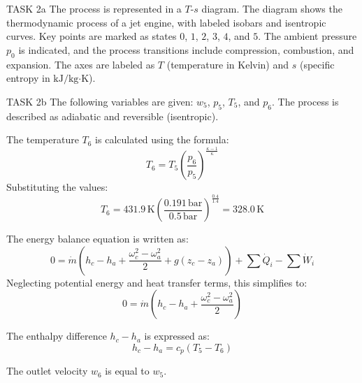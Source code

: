 TASK 2a  
The process is represented in a \( T \)-\( s \) diagram. The diagram shows the thermodynamic process of a jet engine, with labeled isobars and isentropic curves. Key points are marked as states \( 0 \), \( 1 \), \( 2 \), \( 3 \), \( 4 \), and \( 5 \). The ambient pressure \( p_0 \) is indicated, and the process transitions include compression, combustion, and expansion. The axes are labeled as \( T \) (temperature in Kelvin) and \( s \) (specific entropy in \( \text{kJ}/\text{kg·K} \)).  

TASK 2b  
The following variables are given: \( w_5 \), \( p_5 \), \( T_5 \), and \( p_6 \). The process is described as adiabatic and reversible (isentropic).  

The temperature \( T_6 \) is calculated using the formula:  
\[
T_6 = T_5 \left( \frac{p_6}{p_5} \right)^{\frac{\kappa - 1}{\kappa}}
\]  
Substituting the values:  
\[
T_6 = 431.9 \, \text{K} \left( \frac{0.191 \, \text{bar}}{0.5 \, \text{bar}} \right)^{\frac{0.4}{1.4}} = 328.0 \, \text{K}
\]  

The energy balance equation is written as:  
\[
0 = \dot{m} \left( h_c - h_a + \frac{\omega_c^2 - \omega_a^2}{2} + g(z_c - z_a) \right) + \sum \dot{Q}_i - \sum \dot{W}_i
\]  
Neglecting potential energy and heat transfer terms, this simplifies to:  
\[
0 = \dot{m} \left( h_c - h_a + \frac{\omega_c^2 - \omega_a^2}{2} \right)
\]  

The enthalpy difference \( h_c - h_a \) is expressed as:  
\[
h_c - h_a = c_p (T_5 - T_6)
\]  

The outlet velocity \( w_6 \) is equal to \( w_5 \).